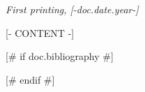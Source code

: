 \documentclass[
	11pt, %
	fleqn, %
	a4paper, %
	oneside, %
]{LegrandOrangeBook}
\begin{document}
\noindent \textit{First printing, [-doc.date.year-]} %


\pagestyle{empty} %

\tableofcontents

\pagestyle{fancy} %

\cleardoublepage %


% 
% 

[- CONTENT -]


[# if doc.bibliography #]

[# endif #]
\end{document}
